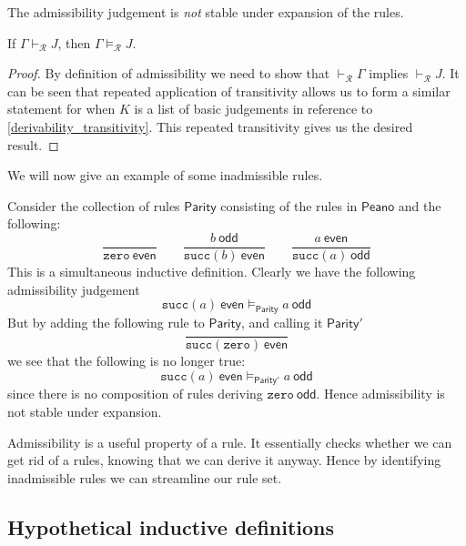 The admissibility judgement is \emph{not} stable under expansion of the rules.

\begin{lemma}
    If $\Gamma \vdash_{\mathcal{R}} J$, then $\Gamma \vDash_{\mathcal{R}} J$.
\end{lemma}

\begin{proof}
    By definition of admissibility we need to show that $\vdash_{\mathcal{R}} \Gamma$ implies $\vdash_{\mathcal{R}} J$. It can be seen that repeated application of transitivity allows us to form a similar statement for when $K$ is a list of basic judgements in reference to \ref{derivability_transitivity}. This repeated transitivity gives us the desired result.
\end{proof}

We will now give an example of some inadmissible rules.

\begin{example}
    Consider the collection of rules $\mathsf{Parity}$ consisting of the rules in $\mathsf{Peano}$ and the following:
    $$
        \frac{}{\texttt{zero}\ \mathsf{even}} \qquad
        \frac{b\ \mathsf{odd}}{\texttt{succ}(b)\ \mathsf{even}} \qquad
        \frac{a\ \mathsf{even}}{\texttt{succ}(a)\ \mathsf{odd}}
    $$
    This is a simultaneous inductive definition. Clearly we have the following admissibility judgement
    $$ \texttt{succ}(a)\ \mathsf{even} \vDash_{\mathsf{Parity}} a\ \mathsf{odd} $$
    But by adding the following rule to $\mathsf{Parity}$, and calling it $\mathsf{Parity}'$
    $$
        \frac{}{\texttt{succ}(\texttt{zero}) \ \mathsf{even}}
    $$
    we see that the following is no longer true:
    $$ \texttt{succ}(a)\ \mathsf{even} \vDash_{\mathsf{Parity'}} a\ \mathsf{odd} $$
    since there is no composition of rules deriving $\texttt{zero}\ \mathsf{odd}$.
    Hence admissibility is not stable under expansion.
\end{example}

\begin{remark}
    Admissibility is a useful property of a rule. It essentially checks whether we can get rid of a rules, knowing that we can derive it anyway. Hence by identifying inadmissible rules we can streamline our rule set.
\end{remark}

\subsection{Hypothetical inductive definitions}

